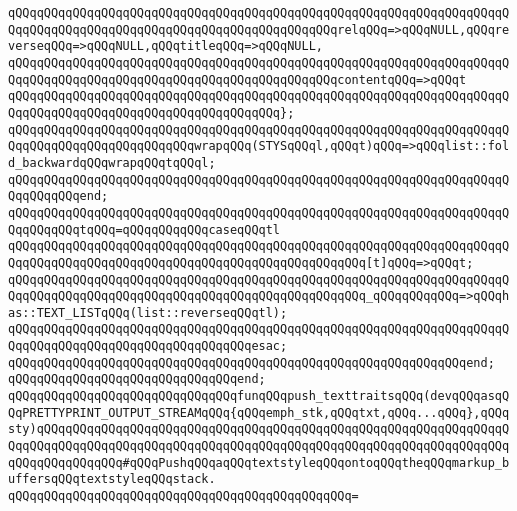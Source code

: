 \verb|qQQqqQQqqQQqqQQqqQQqqQQqqQQqqQQqqQQqqQQqqQQqqQQqqQQqqQQqqQQqqQQqqQQqqQQqqQQqqQQqqQQqqQQqqQQqqQQqqQQqqQQqqQQqqQQqqQQqrelqQQq=>qQQqNULL,qQQqreverseqQQq=>qQQqNULL,qQQqtitleqQQq=>qQQqNULL,|\newline
\verb|qQQqqQQqqQQqqQQqqQQqqQQqqQQqqQQqqQQqqQQqqQQqqQQqqQQqqQQqqQQqqQQqqQQqqQQqqQQqqQQqqQQqqQQqqQQqqQQqqQQqqQQqqQQqqQQqqQQqcontentqQQq=>qQQqt|\newline
\verb|qQQqqQQqqQQqqQQqqQQqqQQqqQQqqQQqqQQqqQQqqQQqqQQqqQQqqQQqqQQqqQQqqQQqqQQqqQQqqQQqqQQqqQQqqQQqqQQqqQQqqQQqqQQq};|\newline
\newline
\verb|qQQqqQQqqQQqqQQqqQQqqQQqqQQqqQQqqQQqqQQqqQQqqQQqqQQqqQQqqQQqqQQqqQQqqQQqqQQqqQQqqQQqqQQqqQQqqQQqwrapqQQq(STYSqQQql,qQQqt)qQQq=>qQQqlist::fold_backwardqQQqwrapqQQqtqQQql;|\newline
\verb|qQQqqQQqqQQqqQQqqQQqqQQqqQQqqQQqqQQqqQQqqQQqqQQqqQQqqQQqqQQqqQQqqQQqqQQqqQQqqQQqend;|\newline
\newline
\verb|qQQqqQQqqQQqqQQqqQQqqQQqqQQqqQQqqQQqqQQqqQQqqQQqqQQqqQQqqQQqqQQqqQQqqQQqqQQqqQQqtqQQq=qQQqqQQqqQQqcaseqQQqtl|\newline
\verb|qQQqqQQqqQQqqQQqqQQqqQQqqQQqqQQqqQQqqQQqqQQqqQQqqQQqqQQqqQQqqQQqqQQqqQQqqQQqqQQqqQQqqQQqqQQqqQQqqQQqqQQqqQQqqQQqqQQqqQQq[t]qQQq=>qQQqt;|\newline
\verb|qQQqqQQqqQQqqQQqqQQqqQQqqQQqqQQqqQQqqQQqqQQqqQQqqQQqqQQqqQQqqQQqqQQqqQQqqQQqqQQqqQQqqQQqqQQqqQQqqQQqqQQqqQQqqQQqqQQqqQQq_qQQqqQQqqQQq=>qQQqhas::TEXT_LISTqQQq(list::reverseqQQqtl);|\newline
\verb|qQQqqQQqqQQqqQQqqQQqqQQqqQQqqQQqqQQqqQQqqQQqqQQqqQQqqQQqqQQqqQQqqQQqqQQqqQQqqQQqqQQqqQQqqQQqqQQqqQQqqQQqesac;|\newline
\verb|qQQqqQQqqQQqqQQqqQQqqQQqqQQqqQQqqQQqqQQqqQQqqQQqqQQqqQQqqQQqqQQqend;|\newline
\verb|qQQqqQQqqQQqqQQqqQQqqQQqqQQqqQQqend;|\newline
\newline
\verb|qQQqqQQqqQQqqQQqqQQqqQQqqQQqqQQqfunqQQqpush_texttraitsqQQq(devqQQqasqQQqPRETTYPRINT_OUTPUT_STREAMqQQq{qQQqemph_stk,qQQqtxt,qQQq...qQQq},qQQqsty)qQQqqQQqqQQqqQQqqQQqqQQqqQQqqQQqqQQqqQQqqQQqqQQqqQQqqQQqqQQqqQQqqQQqqQQqqQQqqQQqqQQqqQQqqQQqqQQqqQQqqQQqqQQqqQQqqQQqqQQqqQQqqQQqqQQqqQQqqQQqqQQqqQQqqQQq#qQQqPushqQQqaqQQqtextstyleqQQqontoqQQqtheqQQqmarkup_buffersqQQqtextstyleqQQqstack.|\newline
\verb|qQQqqQQqqQQqqQQqqQQqqQQqqQQqqQQqqQQqqQQqqQQqqQQq=|\newline
